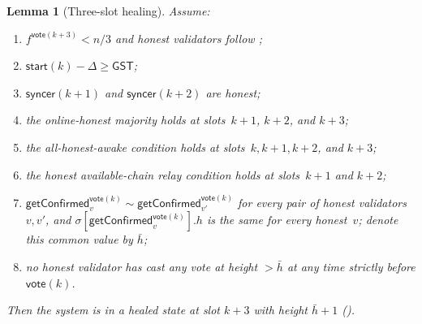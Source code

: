 \documentclass{article}
\newcommand{\syncer}{\mathsf{syncer}}
\newcommand{\start}{\mathsf{start}}
\newcommand{\vote}{\mathsf{vote}}
\newcommand{\comm}[1]{\bar{#1}}
\newcommand{\getConfirmed}{\textsf{getConfirmed}\xspace}
\theoremstyle{plain}
\newtheorem{lemma}{Lemma}
\theoremstyle{definition}
\theoremstyle{remark}
\newcommand{\GST}{\ensuremath{\mathsf{GST}}}
\newcommand{\OHM}{online-honest majority\xspace}
\newcommand{\HAR}{honest available-chain relay\xspace}
\newcommand{\AHA}{all-honest-awake\xspace}
\begin{document}
\begin{lemma}[Three-slot healing]\label{rev:lem:healing-three-slot}
Assume:
\begin{enumerate}
  \item $f^{\vote(k+3)} < n/3$ and honest validators follow ;
  \item $\start(k) - \Delta \geq \GST$;
  \item $\syncer(k+1)$ and $\syncer(k+2)$ are honest;
  \item the \OHM holds at slots~$k+1$, $k+2$, and $k+3$;
  \item the \AHA condition holds at slots~$k, k+1, k+2$, and $k+3$;
  \item the \HAR condition holds at slots~$k+1$ and $k+2$;
  \item $\getConfirmed_v^{\vote(k)} \sim \getConfirmed_{v'}^{\vote(k)}$ for every pair of honest validators~$v, v'$, and $\sigma[\getConfirmed_v^{\vote(k)}].h$ is the same for every honest~$v$; denote this common value by $\comm{h}$;
  \item no honest validator has cast any vote at height $> \comm{h}$ at any time strictly before $\vote(k)$.
\end{enumerate}
Then the system is in a healed state at slot $k+3$ with height $\comm{h}+1$ ().
\end{lemma}
\end{document}
